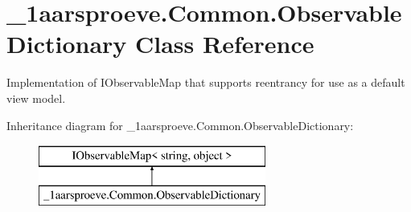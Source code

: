 \hypertarget{class__1aarsproeve_1_1_common_1_1_observable_dictionary}{}\section{\+\_\+1aarsproeve.\+Common.\+Observable\+Dictionary Class Reference}
\label{class__1aarsproeve_1_1_common_1_1_observable_dictionary}


Implementation of I\+Observable\+Map that supports reentrancy for use as a default view model.  


Inheritance diagram for \+\_\+1aarsproeve.\+Common.\+Observable\+Dictionary\+:\begin{figure}[H]
\begin{center}
\leavevmode
\includegraphics[height=2.000000cm]{class__1aarsproeve_1_1_common_1_1_observable_dictionary}
\end{center}
\end{figure}
